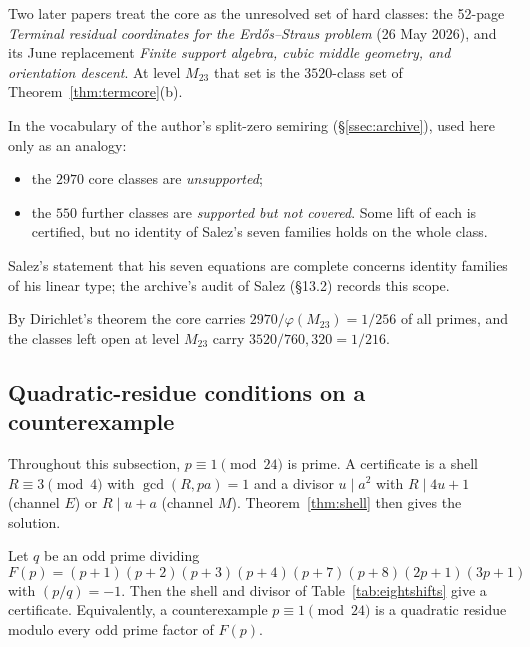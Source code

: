 \begin{remark}\label{rem:termcore}
Two later papers treat the core as the unresolved set of hard classes: the 52-page \emph{Terminal residual coordinates for the Erdős--Straus problem} (26 May 2026), and its June replacement \emph{Finite support algebra, cubic middle geometry, and orientation descent}. At level $M_{23}$ that set is the $3520$-class set of Theorem~\ref{thm:termcore}(b).

In the vocabulary of the author's split-zero semiring (§\ref{ssec:archive}), used here only as an analogy:
\begin{itemize}
\item the $2970$ core classes are \emph{unsupported};
\item the $550$ further classes are \emph{supported but not covered}. Some lift of each is certified, but no identity of Salez's seven families holds on the whole class.
\end{itemize}
Salez's statement that his seven equations are complete concerns identity families of his linear type; the archive's audit of Salez (§13.2) records this scope.

By Dirichlet's theorem the core carries $2970/\varphi(M_{23})=1/256$ of all primes, and the classes left open at level $M_{23}$ carry $3520/760{,}320=1/216$.
\end{remark}

\subsection{Quadratic-residue conditions on a counterexample}\label{ssec:qrconditions}

Throughout this subsection, $p\equiv1\pmod{24}$ is prime. A certificate is a shell $R\equiv3\pmod4$ with $\gcd(R,pa)=1$ and a divisor $u\mid a^2$ with $R\mid4u+1$ (channel $E$) or $R\mid u+a$ (channel $M$). Theorem~\ref{thm:shell} then gives the solution.

\begin{theorem}\label{thm:eightshifts}
Let $q$ be an odd prime dividing
\[
F(p)=(p+1)(p+2)(p+3)(p+4)(p+7)(p+8)(2p+1)(3p+1)
\]
with $(p/q)=-1$. Then the shell and divisor of Table~\ref{tab:eightshifts} give a certificate. Equivalently, a counterexample $p\equiv1\pmod{24}$ is a quadratic residue modulo every odd prime factor of $F(p)$.
\end{theorem}

